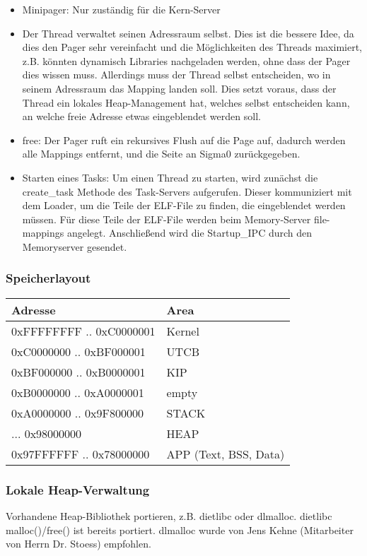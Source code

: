 \begin{itemize}
	\item Minipager: Nur zuständig für die Kern-Server
	
	\item Der Thread verwaltet seinen Adressraum selbst. Dies ist die bessere Idee, da dies den Pager sehr vereinfacht und die Möglichkeiten des Threads maximiert, z.B. könnten dynamisch Libraries nachgeladen werden, ohne dass der Pager dies wissen muss. Allerdings muss  der Thread selbst entscheiden, wo in seinem Adressraum das Mapping landen soll. Dies setzt voraus, dass der Thread ein lokales Heap-Management hat, welches selbst entscheiden kann, an welche freie Adresse etwas eingeblendet werden soll.
	
	\item free: Der Pager ruft ein rekursives Flush auf die Page auf, dadurch werden alle Mappings entfernt, und die Seite an Sigma0 zurückgegeben.
    \item Starten eines Tasks: Um einen Thread zu starten, wird zunächst
        die create\_task Methode des Task-Servers aufgerufen. Dieser
        kommuniziert mit dem Loader, um die Teile der ELF-File zu
        finden, die eingeblendet werden müssen. Für diese Teile der
        ELF-File werden beim Memory-Server file-mappings angelegt.
        Anschließend wird die Startup\_IPC durch den Memoryserver
        gesendet.
\end{itemize}

\subsubsection{Speicherlayout}
\begin{tabular}{|l|l|}
\hline
Adresse & Area \\
\hline
0xFFFFFFFF .. 0xC0000001 & Kernel \\
\hline
0xC0000000 .. 0xBF000001 & UTCB \\
\hline
0xBF000000 .. 0xB0000001 & KIP \\
\hline
0xB0000000 .. 0xA0000001 & empty \\
\hline
0xA0000000 .. 0x9F800000 & STACK \\
\hline
... 0x98000000 & HEAP \\
\hline
0x97FFFFFF .. 0x78000000 & APP (Text, BSS, Data) \\
\hline
\end{tabular}
\subsubsection{Lokale Heap-Verwaltung}

Vorhandene Heap-Bibliothek portieren, z.B. dietlibc oder dlmalloc. dietlibc malloc()/free() ist bereits portiert. dlmalloc wurde von Jens Kehne (Mitarbeiter von Herrn Dr. Stoess) empfohlen.

